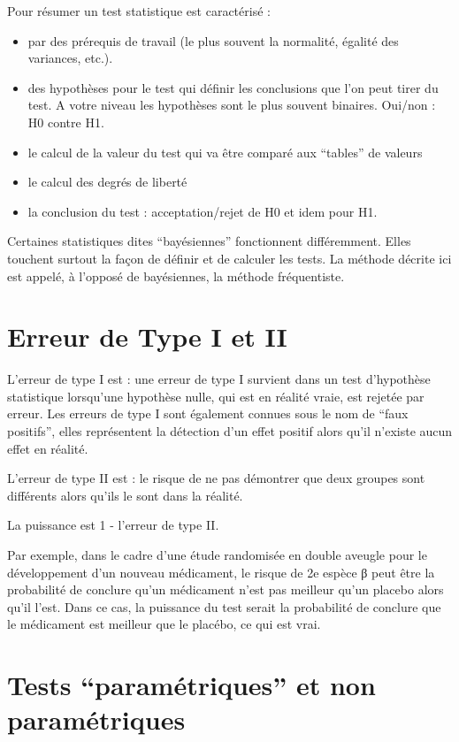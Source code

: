 \documentclass[
]{book}
\begin{document}
Pour résumer un test statistique est caractérisé :

\begin{itemize}
\item
  par des prérequis de travail (le plus souvent la normalité, égalité des
  variances, etc.).
\item
  des hypothèses pour le test qui définir les conclusions que l'on peut tirer du
  test. A votre niveau les hypothèses sont le plus souvent binaires.
  Oui/non : H0 contre H1.
\item
  le calcul de la valeur du test qui va être comparé aux ``tables'' de valeurs
\item
  le calcul des degrés de liberté
\item
  la conclusion du test : acceptation/rejet de H0 et idem pour H1.
\end{itemize}

Certaines statistiques dites ``bayésiennes'' fonctionnent différemment. Elles
touchent surtout la façon de définir et de calculer les tests.
La méthode décrite ici est appelé, à l'opposé de bayésiennes, la méthode
fréquentiste.

\hypertarget{erreur-de-type-i-et-ii}{%
\section{Erreur de Type I et II}\label{erreur-de-type-i-et-ii}}

L'erreur de type I est : une erreur de type I survient dans un test d'hypothèse
statistique lorsqu'une hypothèse nulle, qui est en réalité vraie, est rejetée
par erreur. Les erreurs de type I sont également connues sous le nom de ``faux
positifs'', elles représentent la détection d'un effet positif alors qu'il
n'existe aucun effet en réalité.

L'erreur de type II est : le risque de ne pas démontrer que deux groupes sont
différents alors qu'ils le sont dans la réalité.

La puissance est 1 - l'erreur de type II.

Par exemple, dans le cadre d'une étude randomisée en double aveugle pour le
développement d'un nouveau médicament, le risque de 2e espèce β peut être la
probabilité de conclure qu'un médicament n'est pas meilleur qu'un placebo alors
qu'il l'est. Dans ce cas, la puissance du test serait la probabilité de conclure
que le médicament est meilleur que le placébo, ce qui est vrai.

\hypertarget{tests-paramuxe9triques-et-non-paramuxe9triques}{%
\section{Tests ``paramétriques'' et non paramétriques}\label{tests-paramuxe9triques-et-non-paramuxe9triques}}
\end{document}
